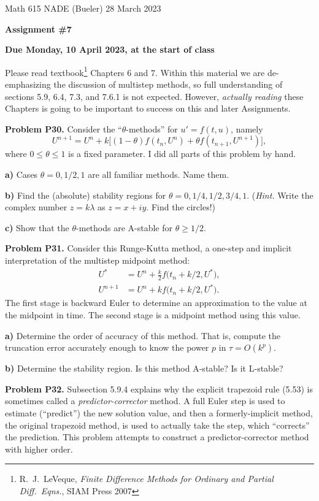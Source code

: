 \documentclass[12pt]{amsart}
\newcommand{\prob}[1]{\bigskip\noindent\textbf{#1}\quad }
\newcommand{\epart}[1]{\medskip\noindent\textbf{#1)}\quad }
\begin{document}
\scriptsize \noindent Math 615 NADE (Bueler) \hfill 28 March 2023
\normalsize

\medskip\bigskip

\Large\centerline{\textbf{Assignment \#7}}
\large
\bigskip

\centerline{\textbf{Due Monday, 10 April 2023, at the start of class}}
\bigskip
\normalsize

\thispagestyle{empty}

\bigskip
Please read textbook\footnote{R.~J.~LeVeque, \emph{Finite Difference Methods for Ordinary and Partial Diff.~Eqns.}, SIAM Press 2007} Chapters 6 and 7.  Within this material we are de-emphasizing the discussion of multistep methods, so full understanding of sections 5.9, 6.4, 7.3, and 7.6.1 is not expected.  However, \emph{actually reading} these Chapters is going to be important to success on this and later Assignments.


\medskip
\prob{Problem P30.}  Consider the ``$\theta$-methods'' for $u' = f(t,u)$, namely
   $$U^{n+1} = U^n + k\Big[(1-\theta)f(t_n,U^n) + \theta f(t_{n+1},U^{n+1})\Big],$$
where $0\le \theta \le 1$ is a fixed parameter.  I did all parts of this problem by hand.

\epart{a} Cases $\theta = 0,1/2,1$ are all familiar methods.  Name them.

\epart{b} Find the (absolute) stability regions for $\theta = 0,1/4,1/2,3/4,1$.  (\emph{Hint.}  Write the complex number $z=k\lambda$ as $z=x+iy$.  Find the circles!)

\epart{c} Show that the $\theta$-methods are A-stable for $\theta \geq 1/2$.


\prob{Problem P31.}  Consider this Runge-Kutta method, a one-step and implicit interpretation of the multistep midpoint method:
\begin{align*}
U^* &= U^n + \frac{k}{2} f\big(t_n + k/2, U^*\big),\\
U^{n+1} &= U^n + k f\big(t_n + k/2, U^*\big).
\end{align*}
The first stage is backward Euler to determine an approximation to the value at the midpoint in time.  The second stage is a midpoint method using this value.

\epart{a}  Determine the order of accuracy of this method.  That is, compute the truncation error accurately enough to know the power $p$ in $\tau=O(k^p)$.

\epart{b}  Determine the stability region.  Is this method A-stable?  Is it L-stable?


\prob{Problem P32.}  Subsection 5.9.4 explains why the explicit trapezoid rule (5.53) is sometimes called a \emph{predictor-corrector} method.  A full Euler step is used to estimate (``predict'') the new solution value, and then a formerly-implicit method, the original trapezoid method, is used to actually take the step, which ``corrects'' the prediction.  This problem attempts to construct a predictor-corrector method with higher order.
\end{document}
